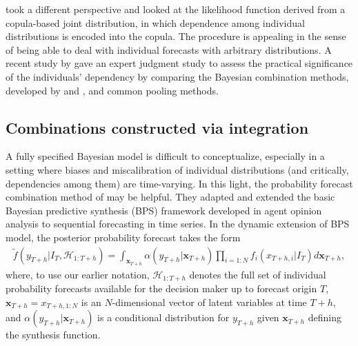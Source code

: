 \documentclass[a4paper,11pt]{article}
\begin{document}
\citet{Jouini1996-fe} took a different perspective and looked at the likelihood function derived from a copula-based joint distribution, in which dependence among individual distributions is encoded into the copula. The procedure is appealing in the sense of being able to deal with individual forecasts with arbitrary distributions. A recent study by \citet{Wilson2017-ct} gave an expert judgment study to assess the practical significance of the individuals' dependency by comparing the Bayesian combination methods, developed by \citet{Winkler1981-bn} and \citet{Jouini1996-fe}, and common pooling methods.

\subsection{Combinations constructed via integration}

A fully specified Bayesian model is difficult to conceptualize, especially in a setting where biases and miscalibration of individual distributions (and critically, dependencies among them) are time-varying. In this light, the probability forecast combination method of \citet{McAlinn2019-kn} may be helpful. They adapted and extended the basic Bayesian predictive synthesis (BPS) framework developed in agent opinion analysis \citep[see, e.g.,][]{Genest1985-bu,West1992-qy,West1992-gr} to sequential forecasting in time series. In the dynamic extension of BPS model, the posterior probability forecast takes the form
\begin{align*}
  \tilde{f}\left(y_{T+h} | I_{T}, \mathcal{H}_{1: T+h}\right) = \int_{\bm{x}_{T+h}} \alpha\left(y_{T+h} | \bm{x}_{T+h}\right) \prod_{i=1: N} f_{i}\left(x_{T+h,i}|I_{T}\right) d \bm{x}_{T+h},
\end{align*}
where, to use our earlier notation, $\mathcal{H}_{1: T+h}$ denotes the full set of individual probability forecasts available for the decision maker up to forecast origin $T$, $\bm{x}_{T+h} = x_{T+h, 1:N}$ is an $N$-dimensional vector of latent variables at time $T+h$, and $\alpha\left(y_{T+h} | \bm{x}_{T+h}\right)$ is a conditional distribution for $y_{T+h}$ given $\bm{x}_{T+h}$ defining the synthesis function.
\end{document}
